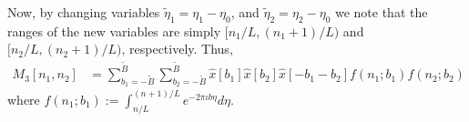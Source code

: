 \documentclass[english,12pt]{article}
\newcommand{\I}{\iota}
\newcommand{\tB}{\tilde{B}}
\begin{document}
Now, by changing variables $\tilde \eta_1=\eta_1-\eta_0$, and $\tilde \eta_2=\eta_2-\eta_0$ we note that the ranges of the new variables are simply $[n_1/L,(n_1+1)/L)$ and $[n_2/L,(n_2+1)/L)$, respectively. 
Thus, 
\begin{equation}
\begin{split}
M_3[n_1,n_2] 
&= \sum_{b_1=-\tB}^{\tB}\sum_{b_2=-\tB}^{\tB} \hat{x}[b_1]\hat{x}[b_2]\hat{x}[-b_1-b_2]
f(n_1;b_1)f(n_2;b_2)
\end{split}
\end{equation}
where $f(n_1;b_1):=\int_{n/L}^{(n+1)/L}e^{-2\pi\I b\eta}d\eta.$
\end{document}
